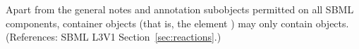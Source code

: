 Apart from the general notes and annotation subobjects permitted on all
SBML components, \ListOfModifierSpeciesReferences container objects (that
is, the \Reaction element ) may only contain
\ModifierSpeciesReference objects.  (References: SBML L3V1
Section~\ref{sec:reactions}.)
